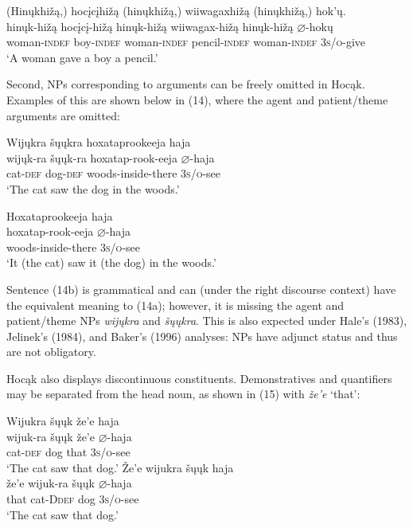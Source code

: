 \documentclass[output=paper]{LSP/langsci}
\begin{document}
\ea
\glll (Hin\k{u}khi\v{z}ą,) 	hoc\k{i}c\k{i}hi\v{z}ą 	(hin\k{u}khi\v{z}ą,) wiiwagaxhi\v{z}ą 	(hin\k{u}khi\v{z}ą,) hok'\k{u}.\\
hin\k{u}k-hi\v{z}ą 		hoc\k{i}c\k{i}-hi\v{z}ą 	hin\k{u}k-hi\v{z}ą 		wiiwagax-hi\v{z}ą 	hin\k{u}k-hi\v{z}ą 	$\varnothing$-hok\k{u}\\
	woman-\textsc{indef}	boy-\textsc{indef} 	woman-\textsc{indef} 	pencil-\textsc{indef} 	woman-\textsc{indef} 	\textsc{3s/o}-give\\
\trans `A woman gave a boy a pencil.'
\z
	
Second, NPs corresponding to arguments can be freely omitted in Hocąk. Examples of this are shown below in (14), where the agent and patient/theme arguments are omitted:

\begin{exe}
\ex
\begin{xlist}
\ex 
\glll Wij\k{u}kra	\v{s}\k{u}\k{u}kra		hoxataprookeeja 		haja\\
wij\k{u}k-ra	\v{s}\k{u}\k{u}k-ra	hoxatap-rook-eeja 	$\varnothing$-haja \\
	cat-\textsc{def} 	dog-\textsc{def} 	woods-inside-there 	\textsc{3s/o}-see \\
\trans `The cat saw the dog in the woods.'

\ex 
\glll Hoxataprookeeja haja \\
hoxatap-rook-eeja 	$\varnothing$-haja \\
woods-inside-there \textsc{3s/o}-see \\
\trans `It (the cat) saw it (the dog) in the woods.'
\end{xlist}
\end{exe}

Sentence (14b) is grammatical and can (under the right discourse context) have the equivalent meaning to (14a); however, it is missing the agent and patient/theme NPs \textit{wij\k{u}kra} and \textit{\v{s}\k{u}\k{u}kra}. This is also expected under Hale's (1983), Jelinek's (1984), and Baker's (1996) analyses: NPs have adjunct status and thus are not obligatory.

Hocąk also displays discontinuous constituents. Demonstratives and quantifiers may be separated from the head noun, as shown in (15) with \textit{\v{z}e'e} `that': 

\begin{exe}
\ex
\begin{xlist}
\ex  
\glll Wijukra	\v{s}\k{u}\k{u}k	\v{z}e'e	haja \\
wijuk-ra	\v{s}\k{u}\k{u}k	\v{z}e'e	$\varnothing$-haja \\
	cat-\textsc{def} 	dog	that		\textsc{3s/o}-see\\
\trans `The cat saw that dog.'
\ex 
\glll \v{Z}e'e	wijukra	 \v{s}\k{u}\k{u}k	haja \\
\v{z}e'e	wijuk-ra	\v{s}\k{u}\k{u}k	$\varnothing$-haja \\
that cat-D\textsc{def} dog \textsc{3s/o}-see \\
\trans `The cat saw that dog.'
\end{xlist}
\end{exe}
\end{document}
